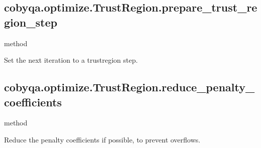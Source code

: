 \documentclass[letterpaper,10pt,english]{sphinxmanual}
\begin{document}
\begin{fulllineitems}
\begin{fulllineitems}
\begin{quote}
\begin{description}
\begin{description}
\end{description}

\end{description}\end{quote}

\end{fulllineitems}



\subsection{cobyqa.optimize.TrustRegion.prepare\_trust\_region\_step}
\label{\detokenize{refs/generated/cobyqa.optimize.TrustRegion.prepare_trust_region_step:cobyqa-optimize-trustregion-prepare-trust-region-step}}\label{\detokenize{refs/generated/cobyqa.optimize.TrustRegion.prepare_trust_region_step::doc}}
\sphinxAtStartPar
method

\begin{fulllineitems}
\label{\detokenize{refs/generated/cobyqa.optimize.TrustRegion.prepare_trust_region_step:cobyqa.optimize.TrustRegion.prepare_trust_region_step}}
\sphinxAtStartPar
Set the next iteration to a trust\sphinxhyphen{}region step.

\end{fulllineitems}



\subsection{cobyqa.optimize.TrustRegion.reduce\_penalty\_coefficients}
\label{\detokenize{refs/generated/cobyqa.optimize.TrustRegion.reduce_penalty_coefficients:cobyqa-optimize-trustregion-reduce-penalty-coefficients}}\label{\detokenize{refs/generated/cobyqa.optimize.TrustRegion.reduce_penalty_coefficients::doc}}
\sphinxAtStartPar
method

\begin{fulllineitems}
\label{\detokenize{refs/generated/cobyqa.optimize.TrustRegion.reduce_penalty_coefficients:cobyqa.optimize.TrustRegion.reduce_penalty_coefficients}}
\sphinxAtStartPar
Reduce the penalty coefficients if possible, to prevent overflows.

\end{fulllineitems}
\end{fulllineitems}
\end{document}
